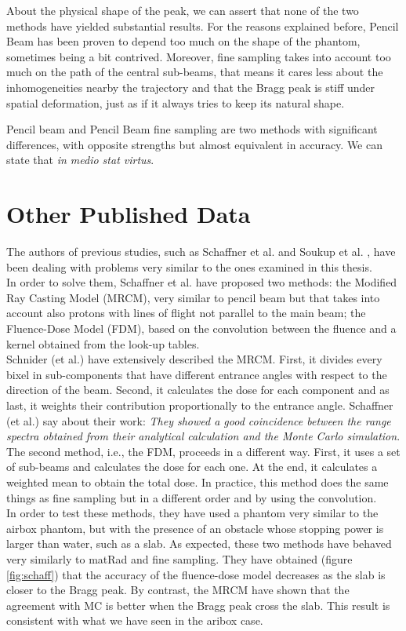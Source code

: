 \documentclass[12pt, a4paper, twoside]{book}
\begin{document}
About the physical shape of the peak, we can assert that none of the two methods have yielded substantial results. For the reasons explained before, Pencil Beam has been proven to depend too much on the shape of the phantom, sometimes being a bit contrived. Moreover, fine sampling takes into account too much on the path of the central sub-beams, that means it cares less about the inhomogeneities nearby the trajectory and that the Bragg peak is stiff under spatial deformation, just as if it always tries to keep its natural shape.

Pencil beam and Pencil Beam fine sampling are two methods with significant differences, with opposite strengths but almost equivalent in accuracy. We can state that \emph{in medio stat virtus}.


\section{Other Published Data}

The authors of previous studies, such as Schaffner et al. \cite{schaf:pba} and Soukup et al. \cite{souk:pba}, have been dealing with problems very similar to the ones examined in this thesis.\\
In order to solve them, Schaffner et al. \cite{schaf:pba} have proposed two methods: the Modified Ray Casting Model (MRCM), very similar to pencil beam but that takes into account also protons with lines of flight not parallel to the main beam; the Fluence-Dose Model (FDM), based on the convolution between the fluence and a kernel obtained from the look-up tables.\\
Schnider (et al.) \cite{schn:pba} have extensively described the MRCM. First, it divides every bixel in sub-components that have different entrance angles with respect to the direction of the beam. Second, it calculates the dose for each component and as last, it weights their contribution proportionally to the entrance angle. Schaffner (et al.) say about their work: \emph{They showed a good coincidence between the range spectra obtained from their analytical calculation and the Monte Carlo simulation}.\\
The second method, i.e., the FDM, proceeds in a different way. First, it uses a set of sub-beams and calculates the dose for each one. At the end, it calculates a weighted mean to obtain the total dose. In practice, this method does the same things as fine sampling but in a different order and by using the convolution.\\
In order to test these methods, they have used a phantom very similar to the airbox phantom, but with the presence of an obstacle whose stopping power is larger than water, such as a slab. As expected, these two methods have behaved very similarly to matRad and fine sampling. They have obtained (figure \ref{fig:schaff}) that the accuracy of the fluence-dose model decreases as the slab is closer to the Bragg peak. By contrast, the MRCM have shown that the agreement with MC is better when the Bragg peak cross the slab. This result is consistent with what we have seen in the aribox case.\\
\end{document}
